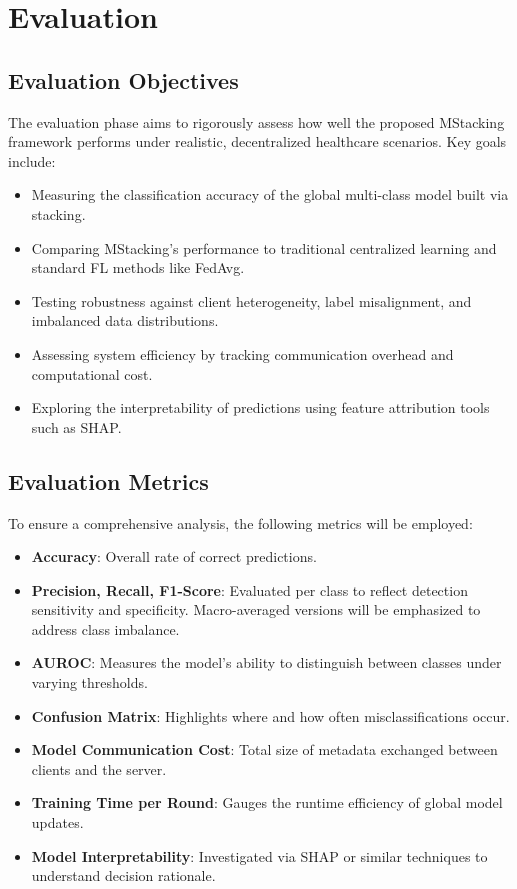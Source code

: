 \chapter{Evaluation}


\section{Evaluation Objectives}
\label{sec:evaluation_objectives}

The evaluation phase aims to rigorously assess how well the proposed MStacking framework performs under realistic, decentralized healthcare scenarios. Key goals include:

\begin{itemize}
    \item Measuring the classification accuracy of the global multi-class model built via stacking.
    \item Comparing MStacking’s performance to traditional centralized learning and standard FL methods like FedAvg.
    \item Testing robustness against client heterogeneity, label misalignment, and imbalanced data distributions.
    \item Assessing system efficiency by tracking communication overhead and computational cost.
    \item Exploring the interpretability of predictions using feature attribution tools such as SHAP.
\end{itemize}

\section{Evaluation Metrics}
\label{sec:evaluation_metrics}

To ensure a comprehensive analysis, the following metrics will be employed:

\begin{itemize}
    \item \textbf{Accuracy}: Overall rate of correct predictions.
    \item \textbf{Precision, Recall, F1-Score}: Evaluated per class to reflect detection sensitivity and specificity. Macro-averaged versions will be emphasized to address class imbalance.
    \item \textbf{AUROC}: Measures the model's ability to distinguish between classes under varying thresholds.
    \item \textbf{Confusion Matrix}: Highlights where and how often misclassifications occur.
    \item \textbf{Model Communication Cost}: Total size of metadata exchanged between clients and the server.
    \item \textbf{Training Time per Round}: Gauges the runtime efficiency of global model updates.
    \item \textbf{Model Interpretability}: Investigated via SHAP or similar techniques to understand decision rationale.
\end{itemize}

